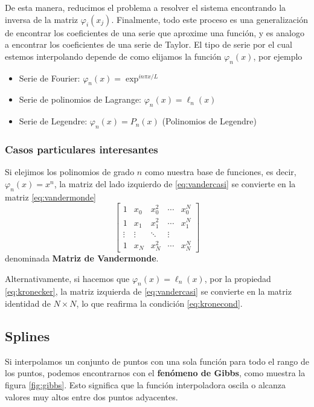 De esta manera, reducimos el problema a resolver el sistema encontrando la inversa de la matriz $\varphi_{i}(x_{j})$. Finalmente, todo este proceso es una generalización de encontrar los coeficientes de una serie que aproxime una función, y es analogo a encontrar los coeficientes de una serie de Taylor. El tipo de serie por el cual estemos interpolando depende de como elijamos la función $\varphi_{n}(x)$, por ejemplo
\begin{itemize}
  \item Serie de Fourier: $\varphi_{n}(x) = \exp^{in \pi x /L}$
  \item Serie de polinomios de Lagrange: $\varphi_{n}(x) = \ell_{n}(x)$
  \item Serie de Legendre: $\varphi_{n}(x) = P_{n}(x)$ (Polinomios de Legendre) 
\end{itemize}

\subsubsection{Casos particulares interesantes}
Si elejimos los polinomios de grado $n$ como nuestra base de funciones, es decir, $\varphi_{n}(x) = x^{n}$, la matriz del lado izquierdo de \eqref{eq:vandercasi} se convierte en la matriz \eqref{eq:vandermonde}
\begin{equation} \label{eq:vandermonde}
  \begin{bmatrix}
    1 & x_{0} & x_{0}^{2} & \cdots & x_{0}^{N} \\
    1 & x_{1} & x_{1}^{2} & \cdots & x_{1}^{N} \\
    \vdots & \vdots & \ddots & \vdots \\
    1 & x_{N} & x_{N}^{2} & \cdots & x_{N}^{N} 
  \end{bmatrix}
\end{equation}
denominada \textbf{Matriz de Vandermonde}.

Alternativamente, si hacemos que $\varphi_{n}(x) = \ell_{n}(x)$, por la propiedad \eqref{eq:kronecker}, la matriz izquierda de \eqref{eq:vandercasi} se convierte en la matriz identidad de $N\times N$, lo que reafirma la condición \eqref{eq:kronecond}.

\subsection{Splines}

Si interpolamos un conjunto de puntos con una sola función para todo el rango de los puntos, podemos encontrarnos con el \textbf{fenómeno de Gibbs}, como muestra la figura \ref{fig:gibbs}. Esto significa que la función interpoladora oscila o alcanza valores muy altos entre dos puntos adyacentes.

